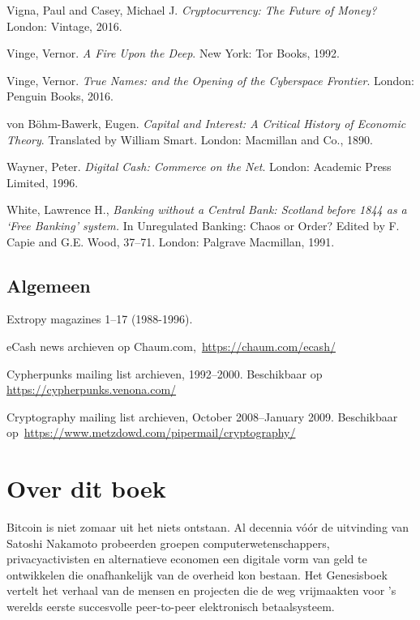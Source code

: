 \documentclass[
  a5paper,
  smalldemyvopaper,11pt,twoside,onecolumn,openright,extrafontsizes,
hidelinks]{memoir}
\begin{document}
{Vigna, Paul and Casey, Michael J. \emph{Cryptocurrency: The Future of
Money?} London: Vintage, 2016.

Vinge, Vernor. \emph{A Fire Upon the Deep}. New York: Tor Books, 1992.

Vinge, Vernor. \emph{True Names: and the Opening of the Cyberspace
Frontier}. London: Penguin Books, 2016.

von Böhm-Bawerk, Eugen. \emph{Capital and Interest: A Critical History
of Economic Theory}. Translated by William Smart. London: Macmillan and
Co., 1890.

Wayner, Peter. \emph{Digital Cash: Commerce on the Net}. London:
Academic Press Limited, 1996.

White, Lawrence H., \emph{Banking without a Central Bank: Scotland
before 1844 as a `Free Banking' system.} In Unregulated Banking: Chaos
or Order? Edited by F. Capie and G.E. Wood, 37--71. London: Palgrave
Macmillan, 1991.

\section*{Algemeen}\label{algemeen}


Extropy magazines 1--17 (1988-1996).

eCash news archieven op Chaum.com,~\url{https://chaum.com/ecash/}

Cypherpunks mailing list archieven, 1992--2000. Beschikbaar op
\url{https://cypherpunks.venona.com/}

Cryptography mailing list archieven, October 2008--January 2009.
Beschikbaar op~\url{https://www.metzdowd.com/pipermail/cryptography/}

}


\chapter*{Over dit boek}\label{over-dit-boek}


Bitcoin is niet zomaar uit het niets ontstaan. Al decennia vóór de
uitvinding van Satoshi Nakamoto probeerden groepen
computerwetenschappers, privacyactivisten en alternatieve economen een
digitale vorm van geld te ontwikkelen die onafhankelijk van de overheid
kon bestaan. Het Genesisboek vertelt het verhaal van de mensen en
projecten die de weg vrijmaakten voor 's werelds eerste succesvolle
peer-to-peer elektronisch betaalsysteem.
\end{document}
